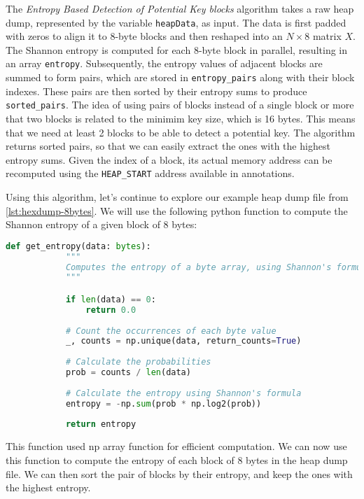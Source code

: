     The \textit{Entropy Based Detection of Potential Key blocks} algorithm takes a raw heap dump, represented by the variable \texttt{heapData}, as input. The data is first padded with zeros to align it to 8-byte blocks and then reshaped into an $N \times 8$ matrix $X$. The Shannon entropy is computed for each 8-byte block in parallel, resulting in an array \texttt{entropy}. Subsequently, the entropy values of adjacent blocks are summed to form pairs, which are stored in \texttt{entropy\_pairs} along with their block indexes. These pairs are then sorted by their entropy sums to produce \texttt{sorted\_pairs}. The idea of using pairs of blocks instead of a single block or more that two blocks is related to the minimim key size, which is 16 bytes. This means that we need at least 2 blocks to be able to detect a potential key. The algorithm returns sorted pairs, so that we can easily extract the ones with the highest entropy sums. Given the index of a block, its actual memory address can be recomputed using the \texttt{HEAP\_START} address available in annotations.
    
    Using this algorithm, let's continue to explore our example heap dump file from \autoref{lst:hexdump-8bytes}. We will use the following python function to compute the Shannon entropy of a given block of 8 bytes:

    \begin{minipage}{\dimexpr\linewidth-20pt}
    \begin{lstlisting}[language=python, caption={Python function to compute the Shannon entropy of a given block of 8 bytes}]
        def get_entropy(data: bytes):
            """
            Computes the entropy of a byte array, using Shannon's formula.
            """

            if len(data) == 0:
                return 0.0
            
            # Count the occurrences of each byte value
            _, counts = np.unique(data, return_counts=True)
            
            # Calculate the probabilities
            prob = counts / len(data)
            
            # Calculate the entropy using Shannon's formula
            entropy = -np.sum(prob * np.log2(prob))
            
            return entropy
    \end{lstlisting}
    \end{minipage}

    This function used np array function for efficient computation. We can now use this function to compute the entropy of each block of 8 bytes in the heap dump file. We can then sort the pair of blocks by their entropy, and keep the ones with the highest entropy.
    
